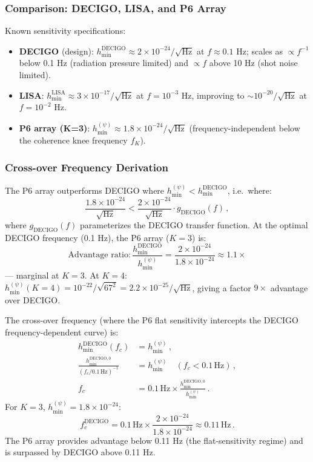 \documentclass[11pt]{article}
\theoremstyle{definition}
\theoremstyle{remark}
\begin{document}
\subsubsection{Comparison: DECIGO, LISA, and P6 Array}

Known sensitivity specifications:
\begin{itemize}
\item \textbf{DECIGO} (design): $h_{\min}^{\mathrm{DECIGO}} \approx 2\times
10^{-24}/\sqrt{\mathrm{Hz}}$ at $f \approx 0.1$ Hz; scales as $\propto f^{-1}$
below 0.1 Hz (radiation pressure limited) and $\propto f$ above 10 Hz
(shot noise limited).
\item \textbf{LISA}: $h_{\min}^{\mathrm{LISA}} \approx 3\times 10^{-17}/\sqrt{\mathrm{Hz}}$
at $f = 10^{-3}$ Hz, improving to $\sim 10^{-20}/\sqrt{\mathrm{Hz}}$ at
$f = 10^{-2}$ Hz.
\item \textbf{P6 array (K=3)}: $h_{\min}^{(\psi)} \approx 1.8\times 10^{-24}/\sqrt{\mathrm{Hz}}$
(frequency-independent below the coherence knee frequency $f_K$).
\end{itemize}

\subsubsection{Cross-over Frequency Derivation}

The P6 array outperforms DECIGO where $h_{\min}^{(\psi)} < h_{\min}^{\mathrm{DECIGO}}$,
i.e.\ where:
\begin{equation}
\frac{1.8\times 10^{-24}}{\sqrt{\mathrm{Hz}}} < \frac{2\times 10^{-24}}{\sqrt{\mathrm{Hz}}}
\cdot g_{\mathrm{DECIGO}}(f)\,,
\end{equation}
where $g_{\mathrm{DECIGO}}(f)$ parameterizes the DECIGO transfer function.
At the optimal DECIGO frequency (0.1 Hz), the P6 array ($K=3$) is:
\begin{equation}
\text{Advantage ratio}: \frac{h_{\min}^{\mathrm{DECIGO}}}{h_{\min}^{(\psi)}}
= \frac{2\times 10^{-24}}{1.8\times 10^{-24}} \approx 1.1\times
\end{equation}
--- marginal at $K = 3$. At $K = 4$:
$h_{\min}^{(\psi)}(K=4) = 10^{-22}/\sqrt{67^2} = 2.2\times 10^{-25}/\sqrt{\mathrm{Hz}}$,
giving a factor $9\times$ advantage over DECIGO.

The cross-over frequency (where the P6 flat sensitivity intercepts the
DECIGO frequency-dependent curve) is:
\begin{align}
h_{\min}^{\mathrm{DECIGO}}(f_c) &= h_{\min}^{(\psi)}\,,\\
\frac{h_{\min}^{\mathrm{DECIGO},0}}{(f_c/0.1\,\mathrm{Hz})^{-1}} &=
h_{\min}^{(\psi)}\quad (f_c < 0.1\,\mathrm{Hz})\,,\\
f_c &= 0.1\,\mathrm{Hz} \times
\frac{h_{\min}^{\mathrm{DECIGO},0}}{h_{\min}^{(\psi)}}\,.
\end{align}
For $K = 3$, $h_{\min}^{(\psi)} = 1.8\times 10^{-24}$:
\begin{equation}
\boxed{
f_c^{\mathrm{DECIGO}} = 0.1\,\mathrm{Hz} \times
\frac{2\times 10^{-24}}{1.8\times 10^{-24}} \approx 0.11\,\mathrm{Hz}\,.
}
\label{eq:fc-DECIGO}
\end{equation}
The P6 array provides advantage below 0.11 Hz (the flat-sensitivity
regime) and is surpassed by DECIGO above 0.11 Hz.
\end{document}
